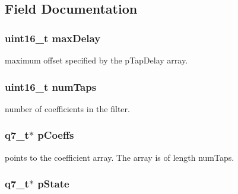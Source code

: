 \subsection{Field Documentation}
\hypertarget{structarm__fir__sparse__instance__q7_ab25f4ee7550e6d92acff77ada283733f}{
\subsubsection[{max\-Delay}]{\setlength{\rightskip}{0pt plus 5cm}uint16\-\_\-t max\-Delay}}\label{structarm__fir__sparse__instance__q7_ab25f4ee7550e6d92acff77ada283733f}
maximum offset specified by the p\-Tap\-Delay array. \hypertarget{structarm__fir__sparse__instance__q7_a751941891e47f522a7f5375fe8990aac}{
\subsubsection[{num\-Taps}]{\setlength{\rightskip}{0pt plus 5cm}uint16\-\_\-t num\-Taps}}\label{structarm__fir__sparse__instance__q7_a751941891e47f522a7f5375fe8990aac}
number of coefficients in the filter. \hypertarget{structarm__fir__sparse__instance__q7_a54407554b4fe7bbbb43924e4eea45e7f}{
\subsubsection[{p\-Coeffs}]{\setlength{\rightskip}{0pt plus 5cm}q7\-\_\-t$\ast$ p\-Coeffs}}\label{structarm__fir__sparse__instance__q7_a54407554b4fe7bbbb43924e4eea45e7f}
points to the coefficient array. The array is of length num\-Taps. \hypertarget{structarm__fir__sparse__instance__q7_aa8f67102521b620af6f259afdcf29785}{
\subsubsection[{p\-State}]{\setlength{\rightskip}{0pt plus 5cm}q7\-\_\-t$\ast$ p\-State}}\label{structarm__fir__sparse__instance__q7_aa8f67102521b620af6f259afdcf29785}
